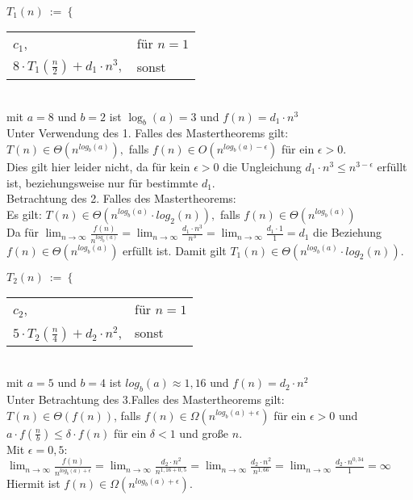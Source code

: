 $T_1(n)\ :=\ \bigg\{$
\begin{tabular}{ll}
$c_1$,&für $n = 1$\\
$8 \cdot T_1(\frac{n}{2}) + d_1 \cdot n^3,$ &sonst
\end{tabular}\\
mit $a = 8$ und $b = 2$ ist $\log_b(a) = 3$ und $f(n) = d_1 \cdot n^3$\\
Unter Verwendung des 1. Falles des Mastertheorems gilt:\\
$T(n) \in  \Theta(n^{log_b(a)}),$ falls $f(n) \in O(n^{log_b(a) - \epsilon})$ für ein $\epsilon > 0$.\\
Dies gilt hier leider nicht, da für kein $\epsilon > 0$ die Ungleichung $d_1 \cdot n^3 \leq n^{3 - \epsilon}$ erfüllt ist, beziehungsweise nur für bestimmte $d_1$.\\
Betrachtung des 2. Falles des Mastertheorems:\\
Es gilt: $T(n) \in  \Theta(n^{log_b(a)}\cdot log_2(n)),$ falls $f(n) \in \Theta(n^{log_b(a)})$\\
Da für $\lim_{n\to\infty}\frac{f(n)}{n^{log_b(a)}} = \lim_{n\to\infty}\frac{d_1\cdot n^3}{n^{3}} = \lim_{n\to\infty}\frac{d_1\cdot 1}{1} = d_1$ die Beziehung $f(n) \in \Theta(n^{log_b(a)})$ erfüllt ist. Damit gilt $T_1(n) \in \Theta(n^{log_b(a)}\cdot log_2(n))$.

$T_2(n)\ :=\ \bigg\{$
\begin{tabular}{ll}
$c_2$,&für $n = 1$\\
$5 \cdot T_2(\frac{n}{4}) + d_2 \cdot n^2$,&sonst
\end{tabular}\\
mit $a=5$ und $b=4$ ist $log_b(a) \approx 1,16$ und $f(n) = d_2 \cdot n^2$\\
Unter Betrachtung des 3.Falles des Mastertheorems gilt:\\
$T(n) \in \Theta(f(n))$, falls $f(n)\in \Omega(n^{log_b(a)+\epsilon})$ für ein $\epsilon > 0$ und $a \cdot f(\frac{n}{b})\leq \delta \cdot f(n)$ für ein $\delta < 1$ und große $n$.\\
Mit $\epsilon = 0,5$:\\
$\lim_{n\to\infty}\frac{f(n)}{n^{log_b(a)+\epsilon}} = \lim_{n\to\infty}\frac{d_2\cdot n^2}{n^{1,16 + 0,5}} = \lim_{n\to\infty}\frac{d_2\cdot n^2}{n^{1,66}} = \lim_{n\to\infty}\frac{d_2\cdot n^{0,34}}{1} = \infty$\\
Hiermit ist $f(n) \in \Omega(n^{log_b(a) + \epsilon})$.
